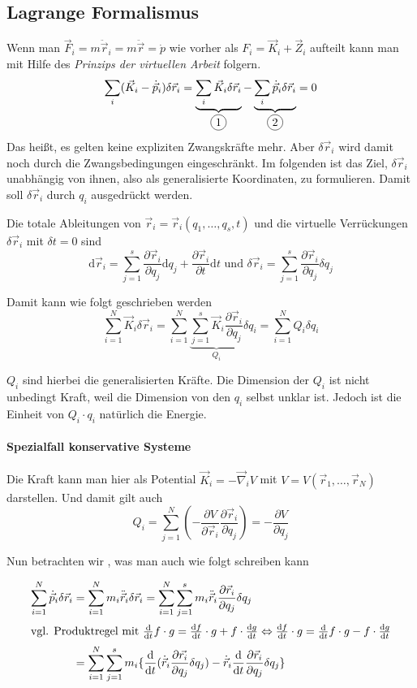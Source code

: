 \documentclass[oneside]{book}
\theoremstyle{definition}
\newcommand{\circled}[1]{\tikz[baseline=(char.base)]{
		\node[shape=circle,draw,inner sep=2pt] (char) {#1};}}
\renewcommand{\d}{\mathrm d}
\newcommand{\dd}[1]{\frac{\d}{\d #1}}
\newcommand{\ddd}[2]{\frac{\d #1}{\d #2}}
\newcommand{\ddv}[1]{\ddot{\vec{#1}}}
\newcommand{\ffpartial}[2]{\frac{\partial #1}{\partial #2}}
\newcommand{\ddotvec}[1]{\ddot{\vec{#1}}}
\begin{document}
\subsection{Lagrange Formalismus}
Wenn man $\vec{F}_i = m \ddotvec{r}_i = m \ddv{r} = \dot p$ wie vorher als $F_i = \vec{K}_i + \vec{Z}_i$ aufteilt kann man mit Hilfe des \textit{Prinzips der virtuellen Arbeit} folgern.
$$\sum_i (\vec{K}_i - \dot{\vec{p}}_i) \delta \vec{r}_i = \underbrace{\sum_i \vec{K}_i \delta\vec{r}_i}_{\circled{1}} - \underbrace{\sum_i \dot{\vec{p}}_i \delta\vec{r}_i}_{\circled{2}} = 0$$
Das heißt, es gelten keine expliziten Zwangskräfte mehr.
Aber $\delta \vec{r}_i$ wird damit noch durch die Zwangsbedingungen eingeschränkt. Im folgenden ist das Ziel, $\delta \vec{r}_i$ unabhängig von ihnen, also als generalisierte Koordinaten, zu formulieren. Damit soll $\delta \vec{r}_i$ durch $q_i$ ausgedrückt werden.

Die totale Ableitungen von $\vec{r}_i = \vec{r}_i(q_1, \dots, q_s, t)$ und die virtuelle Verrückungen $\delta \vec{r}_i$ mit $\delta t = 0$ sind
$$\d \vec{r}_i = \sum_{j = 1}^{s} \frac{\partial \vec{r}_i}{\partial q_j} \d q_j + \frac{\partial \vec{r}_i}{\partial t} \d t \text{~und~} \delta \vec{r}_i = \sum_{j = 1}^s \frac{\partial \vec{r}_i}{\partial q_j} \delta q_j$$

Damit kann \circled{1}  wie folgt geschrieben werden
$$\sum_{i = 1}^N \vec{K}_i \delta \vec{r}_i 
= \sum_{i=1}^N \underbrace{\sum_{j = 1}^s \vec{K}_i \frac{\partial \vec{r}_i}{\partial q_j}}_{Q_i} \delta q_i 
= \sum_{i = 1}^N Q_i \delta q_i$$

$Q_i$ sind hierbei die generalisierten Kräfte. Die Dimension der $Q_i$ ist nicht unbedingt Kraft, weil die Dimension von den $q_i$ selbst unklar ist. Jedoch ist die Einheit von $Q_i \cdot q_i$ natürlich die Energie.

\paragraph{Spezialfall konservative Systeme}
Die Kraft kann man hier als Potential $\vec{K}_i = - \vec\nabla_i V$ mit $V = V(\vec{r}_1, \dots, \vec{r}_N)$ darstellen. Und damit gilt auch
$$Q_i = \sum_{j = 1}^N (- \frac{\partial V}{\partial \vec{r}_i} \ffpartial{\vec{r}_i}{q_j}) = - \ffpartial{V}{q_j}$$

Nun betrachten wir \circled{2}, was man auch wie folgt schreiben kann

\begin{align*}
\sum_{i = 1}^{N} \dot{\vec{p}}_i \delta \vec{r}_i 
&= \sum_{i = 1}^N m_i \ddot{\vec{r}}_i \delta \vec{r}_i 
= \sum_{i = 1}^N \sum_{j = 1}^s m_i \ddot{\vec{r}}_i  \ffpartial{\vec{r}_i}{q_j} \delta q_j \\
\intertext{vgl. Produktregel mit $\dd t f \cdot g = \ddd{f}{t} \cdot g + f \cdot \ddd{g}{t} \Leftrightarrow \ddd{f}{t} \cdot g = \dd t f \cdot g - f \cdot \ddd{g}{t}$}
&= \sum_{i=1}^N \sum_{j=1}^s m_i \{\dd{t} (\dot{\vec{r}}_i \ffpartial{\vec{r_i}}{q_j} \delta q_j) -\dot{\vec{r}}_i \dd{t} \ffpartial{\vec{r}_i}{q_j} \delta q_j \}
\end{align*}
\end{document}
